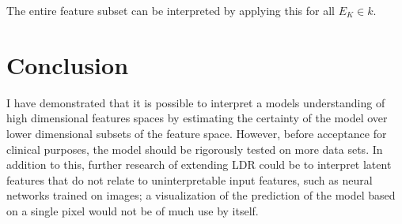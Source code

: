 \documentclass[a4paper, oneside, twocolumn]{article}
\begin{document}
The entire feature subset can be interpreted by applying this for all $E_K \in k$.

\section{Conclusion}\label{Conclusion}

I have demonstrated that it is possible to interpret a models understanding of high dimensional features spaces by estimating the certainty of the model over lower dimensional subsets of the feature space. However, before acceptance for clinical purposes, the model should be rigorously tested on more data sets. In addition to this, further research of extending LDR could be to interpret latent features that do not relate to uninterpretable input features, such as neural networks trained on images; a visualization of the prediction of the model based on a single pixel would not be of much use by itself.

\printbibliography
\end{document}
